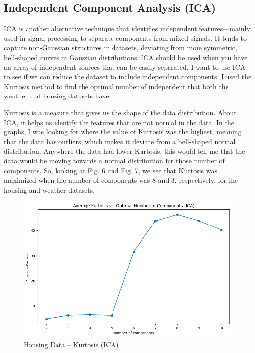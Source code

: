 \documentclass[conference]{IEEEtran}
\begin{document}
\subsection{Independent Component Analysis (ICA)}
\par ICA is another alternative technique that identifies independent features—mainly used in signal processing to separate components from mixed signals. It tends to capture non-Gaussian structures in datasets, deviating from more symmetric, bell-shaped curves in Gaussian distributions. ICA should be used when you have an array of independent sources that can be easily separated. I want to use ICA to see if we can reduce the dataset to include independent components. I used the Kurtosis method to find the optimal number of independent that both the weather and housing datasets have. 
\par Kurtosis is a measure that gives us the shape of the data distribution. About ICA, it helps us identify the features that are not normal in the data. In the graphs, I was looking for where the value of Kurtosis was the highest, meaning that the data has outliers, which makes it deviate from a bell-shaped normal distribution. Anywhere the data had lower Kurtosis, this would tell me that the data would be moving towards a normal distribution for those number of components. So, looking at Fig. 6 and Fig. 7, we see that Kurtosis was maximized when the number of components was 8 and 3, respectively, for the housing and weather datasets. 
\begin{figure}
    \centering
    \includegraphics[width=0.9\linewidth]{figures//housing_figures/step_2b.png}
    \caption{Housing Data -- Kurtosis (ICA)}
    \label{fig:6_housing_kurtosis
}
\end{figure}
\end{document}
